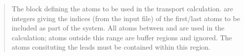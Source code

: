 \documentclass[letterpaper,10pt,english]{sphinxmanual}
\begin{document}
\begin{quote}

\begin{DUlineblock}{0em}
\item[] 
\item[]
\begin{DUlineblock}{\DUlineblockindent}
\item[] 
\end{DUlineblock}
\item[] 
\item[] The block defining the atoms to be used in the transport calculation.  are integers giving the indices (from the input file) of the first/last atoms to be included as part of the system. All atoms between  and  are used in the calculation; atoms outside this range are buffer regions and ignored. The atoms consituting the leads must be contained within this region.
\end{DUlineblock}
\end{quote}
\end{document}
